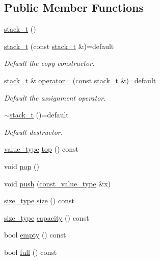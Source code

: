 \subsection*{Public Member Functions}
\begin{DoxyCompactItemize}
\item 
\hyperlink{classstk_1_1stack__t_ab7605ffb3efbfdaf23c1411dba8076d7}{stack\+\_\+t} ()
\item 
\mbox{\label{classstk_1_1stack__t_a27abcc49011f8cd22cd92395655f8ca4}} 
\hyperlink{classstk_1_1stack__t_a27abcc49011f8cd22cd92395655f8ca4}{stack\+\_\+t} (const \hyperlink{classstk_1_1stack__t}{stack\+\_\+t} \&)=default
\begin{DoxyCompactList}\small\item\em Default the copy constructor. \end{DoxyCompactList}\item 
\mbox{\label{classstk_1_1stack__t_a680884feaecd4cb19ea890893c583fdb}} 
\hyperlink{classstk_1_1stack__t}{stack\+\_\+t} \& \hyperlink{classstk_1_1stack__t_a680884feaecd4cb19ea890893c583fdb}{operator=} (const \hyperlink{classstk_1_1stack__t}{stack\+\_\+t} \&)=default
\begin{DoxyCompactList}\small\item\em Default the assignment operator. \end{DoxyCompactList}\item 
\mbox{\label{classstk_1_1stack__t_acd6dfd6efc2edad5c9bd8f126c415a69}} 
\hyperlink{classstk_1_1stack__t_acd6dfd6efc2edad5c9bd8f126c415a69}{$\sim$stack\+\_\+t} ()=default
\begin{DoxyCompactList}\small\item\em Default destructor. \end{DoxyCompactList}\item 
\hyperlink{classstk_1_1stack__t_a05d1586fa8257268f0c1ade7ffc4588e}{value\+\_\+type} \hyperlink{classstk_1_1stack__t_a4c8dca98c8f18b9d60398ac75aba5af7}{top} () const
\item 
void \hyperlink{classstk_1_1stack__t_a5be99b150a46b8456643cbc40bcefca8}{pop} ()
\item 
void \hyperlink{classstk_1_1stack__t_aad7638faa441f17e91ba9a8f5663be4c}{push} (\hyperlink{classstk_1_1stack__t_a27d586bc06e0faf30a2a980cd8ffd125}{const\+\_\+value\+\_\+type} \&x)
\item 
\hyperlink{classstk_1_1stack__t_ade199c494a8e4455f76cc04faf138ed8}{size\+\_\+type} \hyperlink{classstk_1_1stack__t_a50dbd2e6626510af69ba1f38882ca1b5}{size} () const
\item 
\hyperlink{classstk_1_1stack__t_ade199c494a8e4455f76cc04faf138ed8}{size\+\_\+type} \hyperlink{classstk_1_1stack__t_a558f4d8b04d74c04392e47e86723a113}{capacity} () const
\item 
bool \hyperlink{classstk_1_1stack__t_adb144d5de96aeeed6dee8d902158f1a6}{empty} () const
\item 
bool \hyperlink{classstk_1_1stack__t_a62b9e32ef2b123939b4c21175b5fc036}{full} () const
\end{DoxyCompactItemize}
